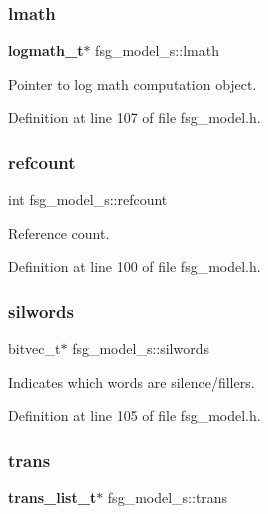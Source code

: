 \subsubsection{lmath}
{\footnotesize\ttfamily \textbf{ logmath\+\_\+t}$\ast$ fsg\+\_\+model\+\_\+s\+::lmath}



Pointer to log math computation object. 



Definition at line 107 of file fsg\+\_\+model.\+h.

\mbox{\label{structfsg__model__s_af329127556a42f6ea3b27f41a99a0b17}} 
\subsubsection{refcount}
{\footnotesize\ttfamily int fsg\+\_\+model\+\_\+s\+::refcount}



Reference count. 



Definition at line 100 of file fsg\+\_\+model.\+h.

\mbox{\label{structfsg__model__s_ab5709e67c1b7506ab024f2060d50331c}} 
\subsubsection{silwords}
{\footnotesize\ttfamily bitvec\+\_\+t$\ast$ fsg\+\_\+model\+\_\+s\+::silwords}



Indicates which words are silence/fillers. 



Definition at line 105 of file fsg\+\_\+model.\+h.

\mbox{\label{structfsg__model__s_ac5cd4b72818b7a9f2dc543d6a6ac9cc7}} 
\subsubsection{trans}
{\footnotesize\ttfamily \textbf{ trans\+\_\+list\+\_\+t}$\ast$ fsg\+\_\+model\+\_\+s\+::trans}



